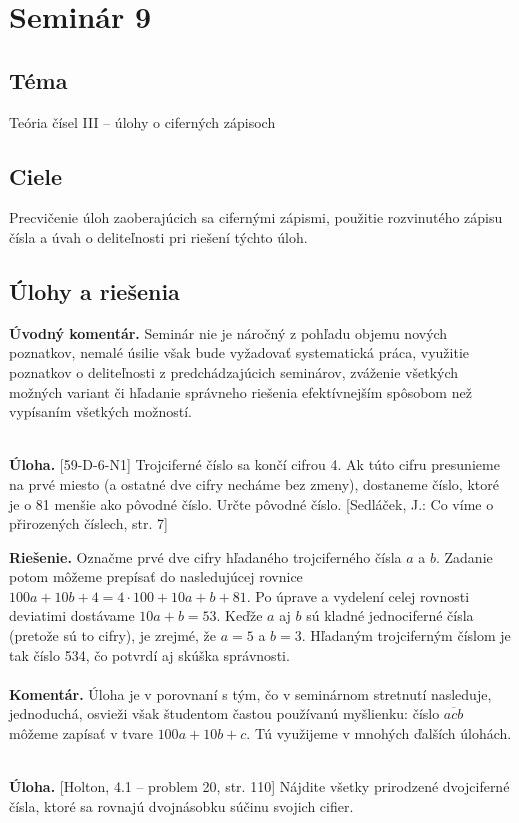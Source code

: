 \documentclass[11pt,a4paper,oneside,final]{book}
\newcommand{\kom}{\textbf{Komentár.} }
\newcommand{\ul}{\textbf{Úloha.} }
\newcommand{\rie}{\textbf{Riešenie.} }
\begin{document}
\newpage
\section*{Seminár 9}
\subsection*{Téma}
Teória čísel III -- úlohy o ciferných zápisoch
\subsection*{Ciele}
Precvičenie úloh zaoberajúcich sa cifernými zápismi, použitie rozvinutého zápisu čísla a úvah o deliteľnosti pri riešení týchto úloh.

\subsection*{Úlohy a riešenia}

\textbf{Úvodný komentár.} Seminár nie je náročný z pohľadu objemu nových poznatkov, nemalé úsilie však bude vyžadovať systematická práca, využitie poznatkov o deliteľnosti z predchádzajúcich seminárov, zváženie všetkých možných variant či hľadanie správneho riešenia efektívnejším spôsobom než vypísaním všetkých možností.\\
\\
\begin{tcolorbox}[breakable,notitle,boxrule=0pt,colback=light-gray,colframe=light-gray]\ul [59-D-6-N1] Trojciferné číslo sa končí cifrou 4. Ak túto cifru presunieme na prvé miesto (a ostatné dve cifry necháme bez zmeny), dostaneme číslo, ktoré je o 81 menšie ako pôvodné číslo. Určte pôvodné číslo. [Sedláček, J.: Co víme o přirozených číslech, str. 7]

\end{tcolorbox}

\rie Označme prvé dve cifry hľadaného trojciferného čísla $a$ a $b$. Zadanie potom môžeme prepísať do nasledujúcej rovnice $100a+10b+4=4\cdot 100 + 10a+b+81$. Po úprave a vydelení celej rovnosti deviatimi dostávame $10a+b=53$. Keďže $a$ aj $b$ sú kladné jednociferné čísla (pretože sú to cifry), je zrejmé, že $a=5$ a $b=3$. Hľadaným trojciferným číslom je tak číslo 534, čo potvrdí aj skúška správnosti. \\
\\
\kom Úloha je v porovnaní s tým, čo v seminárnom stretnutí nasleduje, jednoduchá, osvieži však študentom častou používanú myšlienku: číslo $\overline{acb}$ môžeme zapísať v tvare $100a+10b+c$. Tú využijeme v mnohých ďalších úlohách.\\
\\
\begin{tcolorbox}[breakable,notitle,boxrule=0pt,colback=light-gray,colframe=light-gray]\ul [Holton, 4.1 -- problem 20, str. 110] Nájdite všetky prirodzené dvojciferné čísla, ktoré sa rovnajú dvojnásobku súčinu svojich cifier.

\end{tcolorbox}
\end{document}
